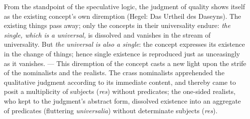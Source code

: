 \documentclass[12pt]{book}
\begin{document}
From the standpoint of the speculative logic, the judgment of quality shows
itself as the existing concept's own diremption (Hegel: Das Urtheil des
Daseyns). The existing things pass away; only the concepts in their
universality endure: \emph{the single, which is a universal,} is dissolved
and vanishes in the stream of universality. But \emph{the universal is also
a single}: the concept expresses its existence in the change of things;
hence single existence is reproduced just as unceasingly as it vanishes.
--- This diremption of the concept casts a new light upon the strife of the
nominalists and the realists. The crass nominalists apprehended the
qualitative judgment according to its immediate content, and thereby came to
posit a multiplicity of subjects (\textit{res}) without predicates; the
one-sided realists, who kept to the judgment's abstract form, dissolved
existence into an aggregate of predicates (fluttering \textit{universalia})
without determinate subjects (\textit{res}).
\end{document}
